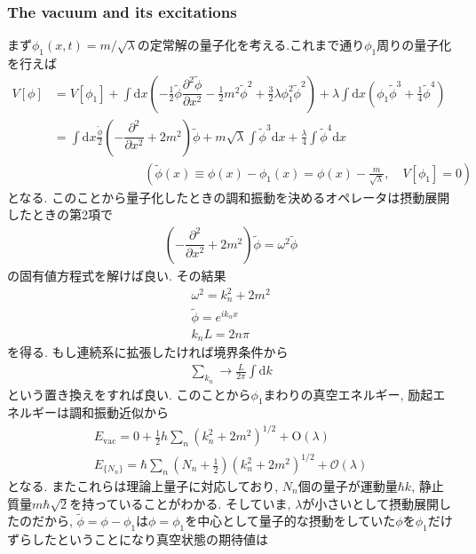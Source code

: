 \documentclass[dvipdfmx,11pt,a4paper,oneside,openany]{jsbook}
\begin{document}
\subsubsection{The vacuum and its excitations}
まず$\phi_1(x,t)=m/\sqrt{\lambda}$の定常解の量子化を考える.これまで通り$\phi_1$周りの量子化を行えば
\begin{align}
    V[\phi] & =V[\phi_1]+\int \mathrm{d}x\left(-\frac{1}{2}\tilde{\phi}\dfrac{\partial^2\tilde{\phi}}{\partial x^2}-\frac{1}{2}m^2\tilde{\phi}^2+\frac{3}{2}\lambda\phi_1^2\tilde{\phi}^2\right)+\lambda\int\mathrm{d}x\left(\phi_1\tilde{\phi}^3+\frac{1}{4}\tilde{\phi}^4\right)\nonumber \\
            & = \int\mathrm{d}x\frac{\tilde{\phi}}{2}\left(-\dfrac{\partial^2}{\partial x^2}+2m^2\right)\tilde{\phi}+m\sqrt{\lambda}\int\tilde{\phi}^3\mathrm{d}x+\frac{\lambda}{4}\int\tilde{\phi}^4\mathrm{d}x                                                                            \\
            & \qquad\ \ \ \ \ \ \ \ \ \ \ \ \ \ \ \ \ \ \ \ \ \ \ \ \left(\tilde{\phi}(x)\equiv\phi(x)-\phi_1(x)=\phi(x)-\frac{m}{\sqrt{\lambda}}, \quad V[\phi_1]=0\right)\nonumber
\end{align}
となる. このことから量子化したときの調和振動を決めるオペレータは摂動展開したときの第2項で
\begin{align*}
    \left(-\dfrac{\partial^2}{\partial x^2}+2m^2\right)\tilde{\phi}=\omega^2\tilde{\phi}
\end{align*}
の固有値方程式を解けば良い. その結果
\begin{align}
    \omega^2=k_n^2+2m^2\nonumber    \\
    \tilde{\phi}=e^{ik_nx}\nonumber \\
    k_nL=2n\pi
\end{align}
を得る. もし連続系に拡張したければ境界条件から
\begin{align*}
    \sum_{k_{n}} \rightarrow \frac{L}{2 \pi} \int \mathrm{d} k
\end{align*}
という置き換えをすれば良い. このことから$\phi_1$まわりの真空エネルギー, 励起エネルギーは調和振動近似から
\begin{align}
    E_{\mathrm{vac}}=0+\frac{1}{2} h \sum_{n}\left(k_{n}^{2}+2 m^{2}\right)^{1 / 2}+\mathrm{O}(\lambda) \\
    E_{\{N_n\}}=\hbar \sum_{n}\left(N_{n}+\frac{1}{2}\right)\left(k_{n}^{2}+2 m^{2}\right)^{1 / 2}+\mathcal{O}(\lambda)\label{eq:5.42}
\end{align}
となる. またこれらは理論上量子に対応しており, $N_n$個の量子が運動量$\hbar k$, 静止質量$m\hbar \sqrt{2}$を持っていることがわかる. そしていま, $\lambda$が小さいとして摂動展開したのだから, $\tilde{\phi}=\phi-\phi_1$は$\phi=\phi_1$を中心として量子的な摂動をしていた$\phi$を$\phi_1$だけずらしたということになり真空状態の期待値は
\end{document}
